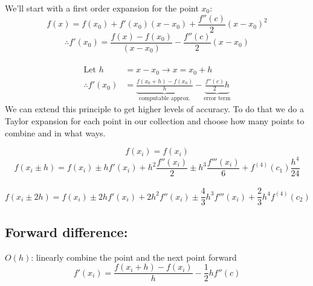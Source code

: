\documentclass[12pt]{exam}
\begin{document}
We'll start with a first order expansion for the point $x_0$:
\[
f(x) = f(x_0) + f'(x_0)(x - x_0) + \frac{f''(c)}{2}(x-x_0)^2 \]
\ifprintanswers
\[
\therefore f'(x_0) = \frac{f(x) - f(x_0)}{(x - x_0)} - \frac{f''(c)}{2}(x-x_0) \]
\else
\\\vspace*{2em}
\fi
%
\begin{align*}
\text{Let } h &= x-x_0 \rightarrow x = x_0 + h \\
%
\therefore f'(x_0) &= \underbrace{\frac{f(x_0 + h) - f(x_0)}{h}}_{\text{computable approx.}} - \underbrace{\frac{f''(c)}{2}h}_{\text{error term}}
\end{align*}
%
We can extend this principle to get higher levels of accuracy. To do that we do a Taylor expansion for each point in our collection and choose how many points to combine and in what ways. 
%
\begin{center}
\end{center}
%

\[
f(x_i) = f(x_i)\]
%
\ifprintanswers
\[
f(x_i \pm h) = f(x_i) \pm hf'(x_i) + h^2\frac{f''(x_i)}{2} \pm h^3\frac{f'''(x_i)}{6} + f^{(4)}(c_1)\frac{h^4}{24} \]
\else
\\\vspace*{2em}
\fi
%
\[
f(x_i \pm 2h) = f(x_i) \pm 2h f'(x_i) + 2 h^2 f''(x_i) \pm \frac{4}{3} h^3 f'''(x_i) + \frac{2}{3}h^4 f^{(4)}(c_2)\]


\subsection*{Forward difference:}
\underline{$O(h)$}: linearly combine the point and the next point forward
\[f'(x_i) = \frac{f(x_i + h) - f(x_i)}{h} - \frac{1}{2}hf''(c)\]
\end{document}
